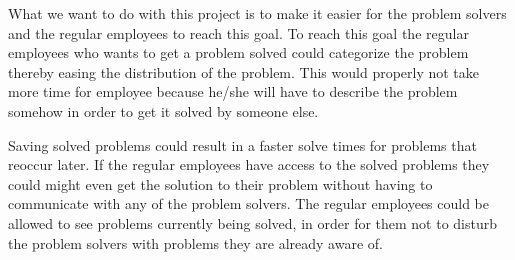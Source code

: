 What we want to do with this project is to make it easier for the problem solvers and the regular employees to reach this goal.
To reach this goal the regular employees who wants to get a problem solved could categorize the problem thereby easing the distribution of the problem.
This would properly not take more time for employee because he/she will have to describe the problem somehow in order to get it solved by someone else.

Saving solved problems could result in a faster solve times for problems that reoccur later.
If the regular employees have access to the solved problems they could might even get the solution to their problem without having to communicate with any of the problem solvers.
The regular employees could be allowed to see problems currently being solved, in order for them not to disturb the problem solvers with problems they are already aware of.








